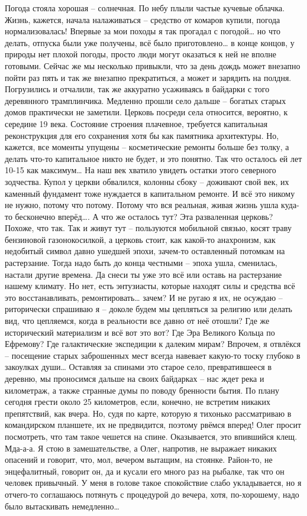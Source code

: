 Погода стояла хорошая – солнечная. По небу плыли частые кучевые облачка. Жизнь, кажется, начала налаживаться – средство от комаров купили, погода нормализовалась! Впервые за мои походы я так прогадал с погодой… но что делать, отпуска были уже получены, всё было приготовлено… в конце концов, у природы нет плохой погоды, просто люди могут оказаться к ней не вполне готовыми. Сейчас же мы несколько привыкли, что за день дождь может внезапно пойти раз пять и так же внезапно прекратиться, а может и зарядить на полдня. 
Погрузились и отчалили, так же аккуратно усаживаясь в байдарки с того деревянного трамплинчика. Медленно прошли село дальше – богатых старых домов практически не заметили. Церковь посреди села относится, вероятно, к середине 19 века. Состояние строения плачевное, требуется капитальная реконструкция для его сохранения хотя бы как памятника архитектуры. Но, кажется, все моменты упущены – косметические ремонты больше без толку, а делать что-то капитальное никто не будет, и это понятно. Так что осталось ей лет 10-15 как максимум… На наш век хватило увидеть остатки этого северного зодчества. Купол у церкви обвалился, колонны сбоку – доживают свой век, их каменный фундамент тоже нуждается в капитальном ремонте. И всё это никому не нужно, потому что потому. Потому что вся реальная, живая жизнь ушла куда-то бесконечно вперёд…. А что же осталось тут? Эта разваленная церковь? Похоже, что так. Так и живут тут – пользуются мобильной связью, косят траву бензиновой газонокосилкой, а церковь стоит, как какой-то анахронизм, как недобитый символ давно ушедшей эпохи, зачем-то оставленный потомкам на растерзание. Тогда надо быть до конца честными – эпоха ушла, сменилась, настали другие времена. Да снеси ты уже это всё или оставь на растерзание нашему климату. Но нет, есть энтузиасты, которые находят силы и средства всё это восстанавливать, ремонтировать… зачем? И не ругаю я их, не осуждаю – риторически спрашиваю я – доколе будем мы цепляться за религию или делать вид, что цепляемся, когда в реальности все давно от неё отошли? Где же исторический материализм и всё вот это вот? Где Эра Великого Кольца по Ефремову? Где галактические экспедиции к далеким мирам?
Впрочем, я отвлёкся – посещение старых заброшенных мест всегда навевает какую-то тоску глубоко в закоулках души… Оставляя за спинами это старое село, превратившееся в деревню, мы проносимся дальше на своих байдарках – нас ждет река и километраж, а также странные думы по поводу бренности бытия. По плану сегодня грести около 25 километров, если, конечно, не встретим никаких препятствий, как вчера. Но, судя по карте, которую я тихонько рассматриваю в командирском планшете, их не предвидится, поэтому рвёмся вперед!
Олег просит посмотреть, что там такое чешется на спине. Оказывается, это впившийся клещ. Мда-а-а. Я стою в замешательстве, а Олег, напротив, не выражает никаких опасений и говорит, что, мол, вечером вытащим, на стоянке. Район-то, не энцефалитный, говорит он, да и кусали его много раз на рыбалке, так что он человек привычный. У меня в голове такое спокойствие слабо укладывается, но я отчего-то соглашаюсь потянуть с процедурой до вечера, хотя, по-хорошему, надо было вытаскивать немедленно…

